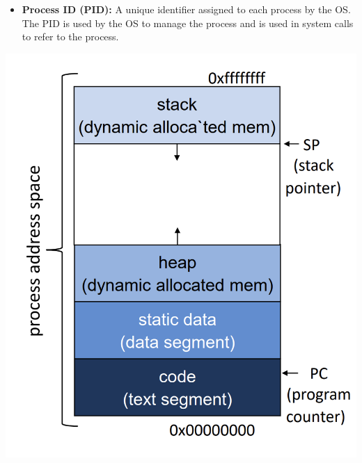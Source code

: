 \documentclass[openany,12pt]{book}
\begin{document}
\begin{center}
\begin{minipage}[t]{0.6\textwidth}
\begin{itemize}
      \item \textbf{Process ID (PID):} A unique identifier assigned to each process by the OS. The PID is used by the OS to manage the process and is used in system calls to refer to the process.
    \end{itemize}
  \end{minipage}%
  \hspace{1em}
  \begin{minipage}[t]{0.35\textwidth}
    \vspace{0pt} %
    \centering
    \includegraphics[width=\linewidth]{../Assets/process_memory.png}
  \end{minipage}
\end{center}
\end{document}
